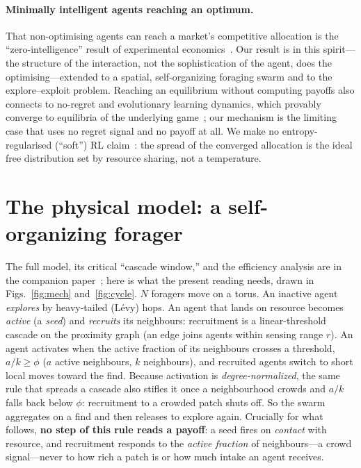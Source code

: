 \documentclass{article}
\begin{document}
\paragraph{Minimally intelligent agents reaching an optimum.} That non-optimising agents can reach a market's
competitive allocation is the ``zero-intelligence'' result of experimental economics~\citep{gode1993allocative}.
Our result is in this spirit---the structure of the interaction, not the sophistication of the agent, does the
optimising---extended to a spatial, self-organizing foraging swarm and to the explore--exploit problem.
Reaching an equilibrium without computing payoffs also connects to no-regret and evolutionary learning
dynamics, which provably converge to equilibria of the underlying
game~\citep{sandholm2010population,hofbauer1998evolutionary}; our mechanism is the limiting case that uses no
regret signal and no payoff at all.
We make no entropy-regularised (``soft'') RL claim~\citep{haarnoja2018soft,ziebart2008maxent}: the spread of
the converged allocation is the ideal free distribution set by resource sharing, not a temperature.

\section{The physical model: a self-organizing forager}
\label{sec:mech}
The full model, its critical ``cascade window,'' and the efficiency analysis are in the companion
paper~\citep{partI}; here is what the present reading needs, drawn in Figs.~\ref{fig:mech} and~\ref{fig:cycle}.
$N$ foragers move on a torus. An inactive agent \emph{explores} by heavy-tailed (L\'evy) hops. An agent that
lands on resource becomes \emph{active} (a \emph{seed}) and \emph{recruits} its neighbours: recruitment is a
linear-threshold cascade on the proximity graph (an edge joins agents within sensing range $r$). An agent
activates when the active fraction of its neighbours crosses a threshold, $a/k\ge\phi$ ($a$ active neighbours,
$k$ neighbours), and recruited agents switch to short local moves toward the find. Because activation is
\emph{degree-normalized}, the same rule that spreads a cascade also stifles it once a neighbourhood crowds and
$a/k$ falls back below $\phi$: recruitment to a crowded patch shuts off. So the swarm aggregates on a find and
then releases to explore again. Crucially for what follows, \textbf{no step of this rule reads a payoff}: a
seed fires on \emph{contact} with resource, and recruitment responds to the \emph{active fraction} of
neighbours---a crowd signal---never to how rich a patch is or how much intake an agent receives.
\end{document}
